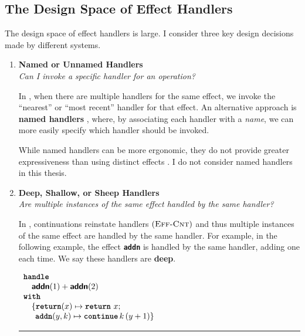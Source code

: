 \subsection{The Design Space of Effect Handlers}\label{subsection:effect-handler-design}
The design space of effect handlers is large. I consider three key design decisions made by different systems.

\renewcommand{\effconfiguration}[2]{{#1}; {#2}}
\renewcommand{\transition}[2]{#1 & \rightarrow & #2}
\newcommand{\rulename}[2]{(\textsc{{#1}-{#2}})}
\newcommand{\reductionRule}[1]{\rulename{Red}{#1}}
\newcommand{\congruenceRule}[1]{\rulename{Cng}{#1}}
\newcommand{\effectRule}[1]{\rulename{Eff}{#1}}

\begin{enumerate} 

 \item \textbf{\textsf{Named or Unnamed Handlers}}\\
        \textit{Can I invoke a specific handler for an operation?}
        
        In \efflang{}, when there are multiple handlers for the same effect, we invoke the ``nearest'' or ``most recent'' handler for that effect. An alternative approach is \textbf{named handlers} \citep{xie-2022}, where, by associating each handler with a \textit{name}, we can more easily specify which handler should be invoked. 

        While named handlers can be more ergonomic, they do not provide greater expressiveness than using distinct effects \citep{xie-2022}. I do not consider named handlers in this thesis.

  \item \textbf{\textsf{Deep, Shallow, or Sheep Handlers}}\\
         \textit{Are multiple instances of the same effect handled by the same handler?}

         In \efflang{}, continuations reinstate handlers $\effectRule{Cnt}$ and thus multiple instances of the same effect are handled by the same handler. For example, in the following example, the effect \textbf{\texttt{addn}} is handled by the same handler, adding one each time. We say these handlers are \textbf{deep}.

         \begin{efflst}
          $\begin{array}{l}
            \textbf{\texttt{handle}} \\
            \quad \textbf{\textsf{addn}}(1) + \textbf{\textsf{addn}}(2) \\
            \textbf{\texttt{with}} \\
            \quad \{ \textbf{\texttt{return}}(x) \mapsto {\texttt{\textbf{return}} \,\, {x}}; \\
            \quad \; \, \textbf{\texttt{addn}}(y, k) \mapsto \textbf{\texttt{continue}} \, {k} \, {(y+1)} \}\\
          \end{array}$
          \vspace{2mm} 
          \textcolor{effComment}{\hrule height 0.2mm \relax}
          \vspace{2mm} 
          

\end{efflst}
\end{enumerate}
